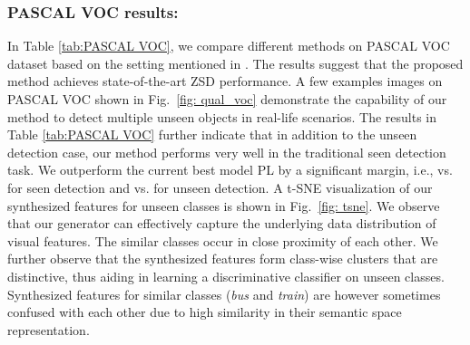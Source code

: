 \documentclass[runningheads]{llncs}
\begin{document}
\subsubsection{PASCAL VOC results:} In Table \ref{tab:PASCAL VOC}, we compare different methods on PASCAL VOC dataset based on the setting mentioned in \cite{demirel2018zero}. The results suggest that the proposed method achieves state-of-the-art ZSD performance. A few examples images on PASCAL VOC shown in Fig.~\ref{fig: qual_voc} demonstrate the capability of our method to detect multiple unseen objects in real-life scenarios. The results in Table \ref{tab:PASCAL VOC} further indicate that in addition to the unseen detection case, our method performs very well in the traditional seen detection task. We outperform the current best model PL \cite{rahman2018polarity} by a significant margin, i.e.,  vs.  for seen detection and  vs.  for unseen detection. A t-SNE visualization of our synthesized features for unseen classes is shown in Fig.~\ref{fig: tsne}. We observe that our generator can effectively capture the underlying data distribution of visual features. The similar classes occur in close proximity of each other. We further observe that the synthesized features form class-wise clusters that are distinctive, thus aiding in learning a discriminative classifier on unseen classes. Synthesized features for similar classes (\emph{bus} and \emph{train}) are however sometimes confused with each other due to high similarity in their semantic space representation.
\end{document}

